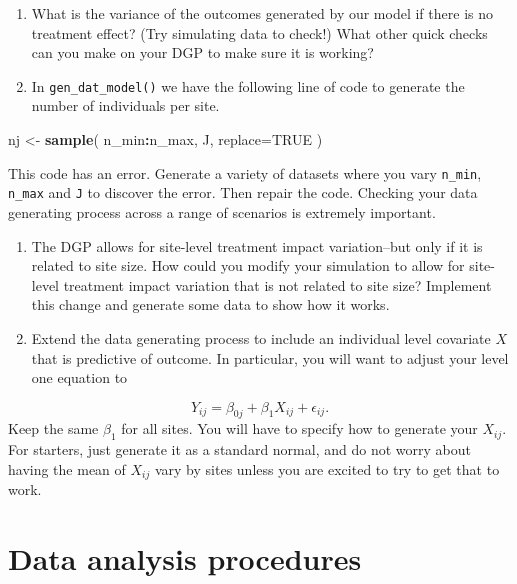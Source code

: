 \documentclass[
]{book}
\newenvironment{Shaded}{\begin{snugshade}}{\end{snugshade}}
\newcommand{\AttributeTok}[1]{\textcolor[rgb]{0.13,0.29,0.53}{#1}}
\newcommand{\ConstantTok}[1]{\textcolor[rgb]{0.56,0.35,0.01}{#1}}
\newcommand{\FunctionTok}[1]{\textcolor[rgb]{0.13,0.29,0.53}{\textbf{#1}}}
\newcommand{\NormalTok}[1]{#1}
\newcommand{\OtherTok}[1]{\textcolor[rgb]{0.56,0.35,0.01}{#1}}
\newcommand{\SpecialCharTok}[1]{\textcolor[rgb]{0.81,0.36,0.00}{\textbf{#1}}}
\begin{document}
\begin{enumerate}
\def\labelenumi{\arabic{enumi}.}
\setcounter{enumi}{3}
\item
  What is the variance of the outcomes generated by our model if there is no treatment effect? (Try simulating data to check!) What other quick checks can you make on your DGP to make sure it is working?
\item
  In \texttt{gen\_dat\_model()} we have the following line of code to generate the number of individuals per site.
\end{enumerate}

\begin{Shaded}
\begin{Highlighting}[]
\NormalTok{nj }\OtherTok{\textless{}{-}} \FunctionTok{sample}\NormalTok{( n\_min}\SpecialCharTok{:}\NormalTok{n\_max, J, }\AttributeTok{replace=}\ConstantTok{TRUE}\NormalTok{ )}
\end{Highlighting}
\end{Shaded}

This code has an error. Generate a variety of datasets where you vary \texttt{n\_min}, \texttt{n\_max} and \texttt{J} to discover the error. Then repair the code.
Checking your data generating process across a range of scenarios is extremely important.

\begin{enumerate}
\def\labelenumi{\arabic{enumi}.}
\setcounter{enumi}{5}
\item
  The DGP allows for site-level treatment impact variation--but only if it is related to site size. How could you modify your simulation to allow for site-level treatment impact variation that is not related to site size? Implement this change and generate some data to show how it works.
\item
  Extend the data generating process to include an individual level covariate \(X\) that is predictive of outcome. In particular, you will want to adjust your level one equation to
\end{enumerate}

\[ Y_{ij} = \beta_{0j} + \beta_{1} X_{ij} + \epsilon_{ij} . \]
Keep the same \(\beta_1\) for all sites.
You will have to specify how to generate your \(X_{ij}\).
For starters, just generate it as a standard normal, and do not worry about having the mean of \(X_{ij}\) vary by sites unless you are excited to try to get that to work.

\chapter{Data analysis procedures}\label{data-analysis-procedures}
\end{document}
